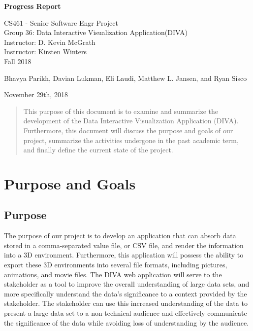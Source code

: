 \documentclass[journal,10pt,onecolumn,compsoc]{IEEEtran} \usepackage[margin=1.0in]{geometry} \usepackage{pdfpages}
\begin{document}
\begin{center}
  
  \textbf{}

  \vspace{4cm}
  \Huge{}
  \textbf {Progress Report}
  \vspace{1.5cm}

 
  \LARGE
  CS461 - Senior Software Engr Project\\
  \vspace{0.25cm}
  Group 36: Data Interactive Visualization Application(DIVA)\\
  Instructor: D. Kevin McGrath \\
  Instructor: Kirsten Winters \\
  \vspace{0.25cm}
  Fall 2018 \\
  \vspace{1.5cm}
  
  \large{Bhavya Parikh, Davian Lukman, Eli Laudi, Matthew L. Jansen, and Ryan Sisco}\\
  \date{November 29th, 2018}
  \vfill
  November 29th, 2018\\
  \vspace{1cm}
  \vspace*{\fill}
   \begin{abstract}
       \noindent This purpose of this document is to examine and summarize the development of the Data Interactive Visualization Application (DIVA). Furthermore, this document will discuss the purpose and goals of our project, summarize the activities undergone in the past academic term, and finally define the current state of the project. 
   \end{abstract}
    \normalsize 
  \end{center}
\newpage
\tableofcontents
\newpage

\section{Purpose and Goals}
\subsection{Purpose}
The purpose of our project is to develop an application that can absorb data stored in a comma-separated value file, or CSV file, and render the information into a 3D environment. Furthermore, this application will possess the ability to export these 3D environments into several file formats, including pictures, animations, and movie files. The DIVA web application will serve to the stakeholder as a tool to improve the overall understanding of large data sets, and more specifically understand the data's significance to a context provided by the stakeholder. The stakeholder can use this increased understanding of the data to present a large data set to a non-technical audience and effectively communicate the significance of the data while avoiding loss of understanding by the audience. 
\end{document}

